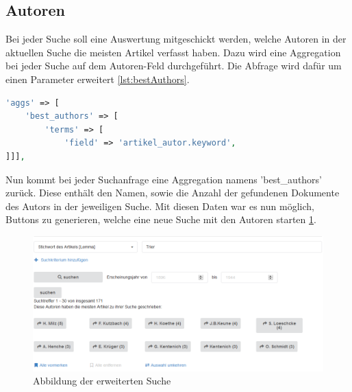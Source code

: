 \subsection{Autoren}

Bei jeder Suche soll eine Auswertung mitgeschickt werden, welche Autoren in der aktuellen Suche die meisten Artikel verfasst haben. Dazu wird eine Aggregation bei jeder Suche auf dem Autoren-Feld durchgeführt. Die Abfrage wird dafür um einen Parameter erweitert \ref{lst:bestAuthors}.

\begin{lstlisting}[language=PHP, frame=single, label={lst:bestAuthors}] 
'aggs' => [
    'best_authors' => [
        'terms' => [
            'field' => 'artikel_autor.keyword',
]]],
\end{lstlisting}


Nun kommt bei jeder Suchanfrage eine Aggregation namens 'best\_authors' zurück. Diese enthält den Namen, sowie die Anzahl der gefundenen Dokumente des Autors in der jeweiligen Suche. 
Mit diesen Daten war es nun möglich, Buttons zu generieren, welche eine neue Suche mit den Autoren starten \ref{img:erweiterteSuche}.


\begin{figure}
	\centering
	\includegraphics[width=1\linewidth]{images/best_authors.png}
	\caption{Abbildung der erweiterten Suche}
	\label{img:erweiterteSuche}
\end{figure}
